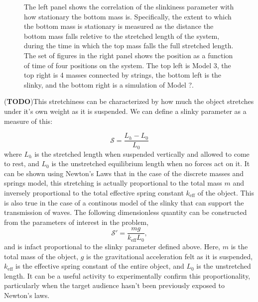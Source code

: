 \documentclass[prb,preprint,superscriptaddress]{revtex4-1}
\newcommand{\TODO}[1]{\marginpar{\raggedright\scriptsize\textbf{TODO:} #1} (\textbf{TODO})}
\begin{document}
\begin{figure}[t!]
\begin{tabular}{cccc}
  \end{tabular}

  \caption{The left panel shows the correlation of the slinkiness parameter with
           how stationary the bottom mass is. Specifically, the extent to which the
           bottom mass is stationary is measured as the distance the bottom mass falls
           reletive to the stretched length of the system, during the time in which
           the top mass falls the full stretched length. The set of figures in the
           right panel shows the position as a function of time of four positions
           on the system. The top left is Model 3, the top right is 4 masses connected
           by strings, the bottom left is the slinky, and the bottom right is a
           simulation of Model ?.}
  \label{fig:discretemodel}
\end{figure}

\TODO{Motivate this defninition.}This stretchiness can be characterized by how much the object stretches
under it's own weight as it is suspended.   We can define a slinky parameter as a measure of this:

\begin{equation}
\mathcal{S}=\frac{L_h-L_0}{L_0}
\end{equation}
where $L_h$ is the stretched length when suspended vertically and allowed to come to rest, and $L_0$ is the unstretched equilibrium length
when no forces act on it.  It can be shown using Newton's Laws that in the case of the discrete masses and springs model,
this stretching is actually proportional to the total mass $m$ and inversely proportional to the total effective spring constant $k_{\text{eff}}$ of the object.
This is also true in the case of a continous model of the slinky that can support the transmission of waves.  The following dimensionless quantity
can be constructed from the parameters of interest in the problem,
\begin{equation}
\mathcal{S'}=\frac{m g}{k_\text{eff} L_0 },
\end{equation}
 and is infact proportional to the  slinky parameter defined above.  Here, $m$ is the total mass of the object, $g$ is the gravitational acceleration felt as it is suspended, $k_\text{eff}$ is the effective spring constant of the entire object, and $L_0$ is the unstretched length.  It can be a useful activity to experimentally 
confirm this proportionality, particularly when the target audience hasn't been previously exposed to Newton's laws.
\end{document}
